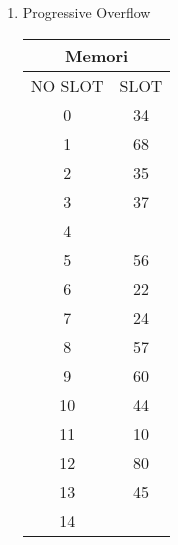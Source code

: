 \documentclass[12pt,a4paper]{article}
\begin{document}
\begin{enumerate}

  \item Progressive Overflow

    \begin{multicols}{2}

      \begin{center}
        \begin{adjustbox}{scale=1,center}
          \begin{tabular}{ |c|c| } 
            \hline \multicolumn{2}{|c|}{Memori} \\ \hline \hline 
            NO SLOT & SLOT  \\ \hline \hline
            0       & 34    \\ \hline
            1       & 68    \\ \hline
            2       & 35    \\ \hline
            3       & 37    \\ \hline
            4       &       \\ \hline
            5       & 56    \\ \hline
            6       & 22    \\ \hline
            7       & 24    \\ \hline
            8       & 57    \\ \hline
            9       & 60    \\ \hline
            10      & 44    \\ \hline
            11      & 10    \\ \hline
            12      & 80    \\ \hline
            13      & 45    \\ \hline
            14      &       \\ \hline

          \end{tabular}
        \end{adjustbox}
      \end{center}


\end{multicols}
\end{enumerate}
\end{document}
